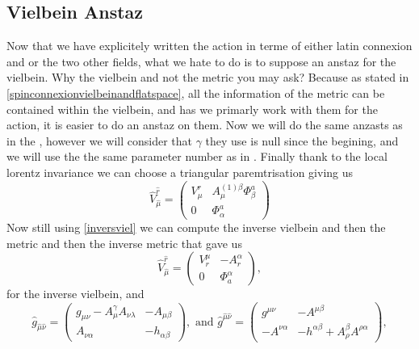 \documentclass{article}
\begin{document}
\subsection{Vielbein Anstaz} \label{part:vielbeinanstaz}
Now that we have explicitely written the action in terme of either latin connexion and or the two other fields, what we hate to do is to suppose an anstaz for the vielbein. Why the vielbein and not the metric you may ask? Because as stated in  \ref{spinconnexionvielbeinandflatspace},
all the information of the metric can be contained within the vielbein, and has we primarly work with them for the action, it is easier to do an anstaz on them. Now we will do the same anzasts as in the \cite{scherk1979get},
however we will consider that $\gamma $ they use is null since the begining, and we will use the the same parameter number as in \cite{maharana1993noncompact}. Finally thank to the local lorentz invariance we can choose a triangular paremtrisation giving us
\begin{equation} \label{vielbeinanstaz}
    \boxed{\hat V^{\hat r}_{\hat \mu} =\begin{pmatrix}
    V^{r}_{\mu} & A^{(1)\beta }_{\mu} \Phi^{a}_{\beta} \\ 0 & \Phi^{a}_\alpha
    \end{pmatrix}   }
\end{equation}
Now still using \eqref{inversviel} we can compute the inverse vielbein and then the metric and then the inverse metric that gave us
\begin{equation} \label{expinverseviel}
    \hat V^{\hat r}_{\hat \mu} = \begin{pmatrix} 
         V^\mu_r &  - A^{\alpha }_r \\ 0 & \Phi^\alpha_a
    \end{pmatrix},
\end{equation}
for the inverse vielbein, and
\begin{equation} \label{expmetric}
    \hat g_{\hat \mu \hat \nu} = \begin{pmatrix}
        g_{\mu \nu} - A^{\gamma}_{\mu}A_{\nu \lambda} & - A_{\mu \beta} \\  A_{\nu \alpha} &-h_{\alpha \beta}
    \end{pmatrix}, \text{ and }
    \hat g^{\hat \mu \hat \nu} = \begin{pmatrix}
        g^{\mu \nu}  & - A^{\mu \beta} \\ - A^{\nu \alpha} &-h^{\alpha \beta}+ A^{\beta}_{\rho}A^{\rho \alpha}
    \end{pmatrix},
\end{equation}
\end{document}
